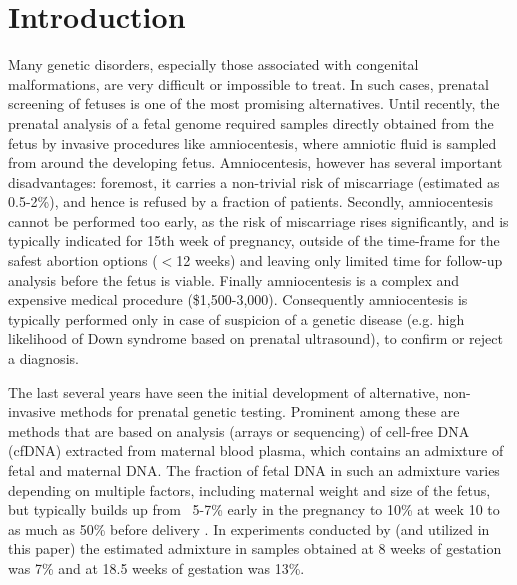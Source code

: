 \section{Introduction}

Many genetic disorders, especially those associated with congenital malformations, are very difficult or impossible to treat. In such cases, prenatal screening of fetuses is one of the most promising alternatives. 
Until recently, the prenatal analysis of a fetal genome required samples directly obtained from the fetus by invasive procedures like amniocentesis, where amniotic fluid is sampled from around the developing fetus.
Amniocentesis, however has several important disadvantages: foremost, it carries a non-trivial risk of miscarriage (estimated as 0.5-2\%), and hence is refused by a fraction of patients. Secondly, amniocentesis cannot be performed too early, as the risk of miscarriage rises significantly, and is typically indicated for 15th week of pregnancy, outside of the time-frame for the safest abortion options ($<$12 weeks) and leaving only limited time for follow-up analysis before the fetus is viable. Finally amniocentesis is a complex and expensive medical procedure (\$1,500-3,000). Consequently amniocentesis is typically performed only in case of suspicion of a genetic disease (e.g. high likelihood of Down syndrome based on prenatal ultrasound), to confirm or reject a diagnosis. 

The last several years have seen the initial development of alternative, non-invasive methods for prenatal genetic testing. Prominent among these are methods that are based on analysis (arrays or sequencing) of  cell-free DNA (cfDNA) extracted from maternal blood plasma, which contains an admixture of fetal and maternal DNA. The fraction of fetal DNA in such an admixture varies depending on multiple factors, including maternal weight and size of the fetus, but typically builds up from ~5-7\% early in the pregnancy to 10\% at week 10 \cite{wang2013} to as much as 50\% before delivery \cite{wang2013, fan2012}. In experiments conducted by \cite{kitzman2012} (and utilized in this paper) the estimated admixture in samples obtained at 8 weeks of gestation was 7\% and at 18.5 weeks of gestation was 13\%. 

